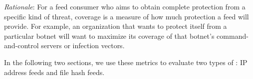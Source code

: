 \emph{Rationale}: For a feed consumer who aims to obtain complete protection
from a specific kind of threat, coverage is a measure of how much protection
a feed will provide. For example, an organization that wants to protect itself
from a particular botnet will want to maximize its coverage of that botnet's
command-and-control servers or infection vectors.

In the following two sections, we use these metrics to evaluate two types of
\ti: IP address feeds and file hash feeds.
